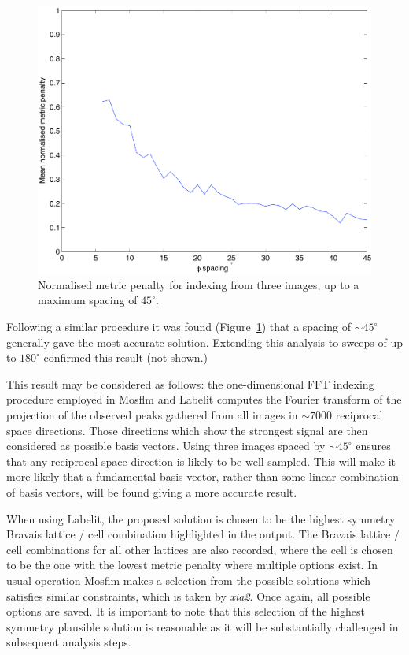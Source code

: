 \documentclass[preprint,pdf]{iucr}
\begin{document}
\begin{figure}
\caption{Normalised metric penalty for indexing from three images, up
  to a maximum spacing of $45^{\circ}$.
\label{figure:phi_spacing_45a}}
\centering
\includegraphics[scale=0.5]{figures/phi_spacing_45a.pdf}
\end{figure}

Following a similar procedure it was found
(Figure~\ref{figure:phi_spacing_45a}) that a 
spacing of $\sim 45^{\circ}$ generally gave the most accurate
solution. Extending this analysis to sweeps of up to $180^{\circ}$
confirmed this result (not shown.) 

This result may be considered as follows: the one-dimensional FFT
indexing procedure employed in Mosflm and Labelit computes the
Fourier transform of the projection of the observed peaks gathered
from all images in $\sim
7000$ reciprocal space directions. Those directions which show the
strongest signal are then considered as possible basis vectors. Using
three images spaced by $\sim 45^{\circ}$ ensures that any reciprocal
space direction is likely to be well sampled. This will make it more likely
that a fundamental basis vector, rather than some linear combination
of basis vectors, will be found giving a more accurate result.

When using Labelit, the proposed solution is chosen to be the highest symmetry
Bravais lattice / cell combination highlighted in the output. The
Bravais lattice / cell combinations for all other lattices are also
recorded, where the cell is chosen to be the one with the lowest
metric penalty where multiple options exist. In usual operation Mosflm
makes a selection from the possible solutions which satisfies similar
constraints, which is taken by \emph{xia2}. Once again, all possible
options are saved. It is important to note that this selection of the
highest symmetry plausible solution is reasonable as it will be
substantially challenged in subsequent analysis steps.
\end{document}
